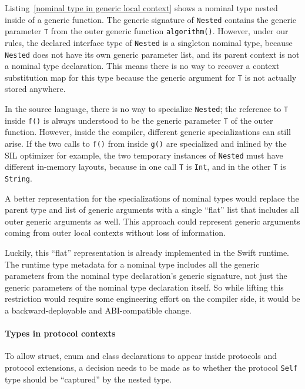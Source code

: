 \documentclass[a4paper,headsepline,bibliography=totoc,toc=flat,fleqn,twoside=semi]{scrbook}
\theoremstyle{definition}
\theoremstyle{definition}
\theoremstyle{definition}
\begin{document}
Listing~\ref{nominal type in generic local context} shows a nominal type nested inside of a generic function. The generic signature of \texttt{Nested} contains the generic parameter \texttt{T} from the outer generic function \texttt{algorithm()}. However, under our rules, the declared interface type of \texttt{Nested} is a singleton nominal type, because \texttt{Nested} does not have its own generic parameter list, and its parent context is not a nominal type declaration. This means there is no way to recover a context substitution map for this type because the generic argument for \texttt{T} is not actually stored anywhere.

In the source language, there is no way to specialize \texttt{Nested}; the reference to \texttt{T} inside \texttt{f()} is always understood to be the generic parameter \texttt{T} of the outer function. However, inside the compiler, different generic specializations can still arise. If the two calls to \texttt{f()} from inside \texttt{g()} are specialized and inlined by the SIL optimizer for example, the two temporary instances of \texttt{Nested} must have different in-memory layouts, because in one call \texttt{T} is \texttt{Int}, and in the other \texttt{T} is \texttt{String}.

A better representation for the specializations of nominal types would replace the parent type and list of generic arguments with a single ``flat'' list that includes all outer generic arguments as well. This approach could represent generic arguments coming from outer local contexts without loss of information.

Luckily, this ``flat'' representation is already implemented in the Swift runtime. The runtime type metadata for a nominal type includes all the generic parameters from the nominal type declaration's generic signature, not just the generic parameters of the nominal type declaration itself. So while lifting this restriction would require some engineering effort on the compiler side, it would be a backward-deployable and ABI-compatible change.

\paragraph{Types in protocol contexts} To allow struct, enum and class declarations to appear inside protocols and protocol extensions, a decision needs to be made as to whether the protocol \texttt{Self} type should be ``captured'' by the nested type.
\end{document}
